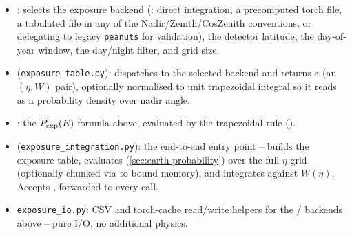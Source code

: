 \begin{implbox}
\begin{itemize}
  \item {}: selects the exposure backend
    (:  direct integration,
     a precomputed torch file,  a tabulated file
    in any of the Nadir/Zenith/CosZenith conventions, or 
    delegating to legacy \texttt{peanuts} for validation), the detector
    latitude, the day-of-year window, the day/night filter, and grid size.
  \item {}
    (\texttt{exposure\_table.py}): dispatches to the selected backend and
    returns a  (an $(\eta, W)$ pair),
    optionally normalised to unit trapezoidal integral so it reads as a
    probability density over nadir angle.
  \item {}:
    the $P_{\rm exp}(E)$ formula above, evaluated by the trapezoidal rule
    ().
  \item {} (\texttt{exposure\_integration.py}):
    the end-to-end entry point -- builds the exposure table, evaluates
     (\cref{sec:earth-probability}) over
    the full $\eta$ grid (optionally chunked via  to bound
    memory), and integrates against $W(\eta)$. Accepts
    , forwarded to every
     call.
  \item \texttt{exposure\_io.py}: CSV and torch-cache read/write helpers
    for the / backends above -- pure I/O, no
    additional physics.
\end{itemize}
\end{implbox}
